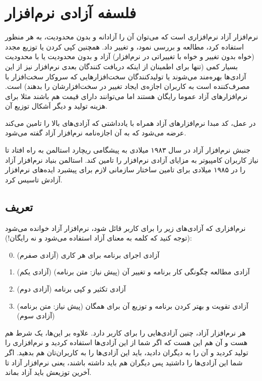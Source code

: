 \section{فلسفه آزادی نرم‌افزار}
نرم‌افزار آزاد نرم‌افزاری است که می‌توان آن را آزادانه و بدون محدودیت، به هر منظور استفاده کرد، مطالعه و بررسی نمود، و تغییر داد. همچنین کپی کردن یا توزیع مجدد (خواه بدون تغییر و خواه با تغییراتی در نرم‌افزار) آزاد و بدون محدودیت یا با محدودیت بسیار کمی (تنها برای اطمینان از اینکه دریافت کنندگان بعدی نرم‌افزار نیز از این آزادی‌ها بهره‌مند می‌شوند یا تولیدکنندگان سخت‌افزارهایی که سروکار سخت‌افزار با مصرف‌کننده‌ است به کاربران اجازه‌ی ایجاد تغییر در سخت‌افزارشان را بدهند) است. نرم‌افزارهای آزاد عموما رایگان هستند اما می‌توانند دارای قیمت هم باشند مثلا برای هزینه تولید 
 و دیگر اَشکال توزیع آن.

در عمل، کد مبدا نرم‌افزارهای آزاد همراه با یادداشتی که آزادی‌های بالا را تامین می‌کند عرضه می‌شود که به آن اجازه‌نامه نرم‌افزار آزاد گفته می‌شود.

جنبش نرم‌افزار آزاد در سال ۱۹۸۳ میلادی به پیشگامی ریچارد استالمن به راه افتاد تا نیاز کاربران کامپیوتر به مزایای آزادی نرم‌افزار را تامین کند. استالمن بنیاد نرم‌افزار آزاد را در ۱۹۸۵ میلادی برای تامین ساختار سازمانی لازم برای پیشبرد ایده‌های نرم‌افزار آزادش تاسیس کرد.
\subsection*{تعریف}
\begin{mybox}
	نرم‌افزاری که آزادی‌های زیر را برای کاربر قائل شود، نرم‌افزار آزاد خوانده می‌شود (توجه کنید که کلمه 
	به معنای آزاد استفاده می‌شود و نه رایگان!):
	
	\begin{enumerate}
		\setcounter{enumi}{-1}
		\item آزادی اجرای برنامه برای هر کاری (آزادی صفرم)
		\item آزادی مطالعه چگونگی کار برنامه و تغییر آن (پیش نیاز: متن برنامه) (آزادی یکم)
		\item آزادی تکثیر و کپی برنامه (آزادی دوم)
		\item آزادی تقویت و بهتر کردن برنامه و توزیع آن برای همگان (پیش نیاز: متن برنامه) (آزادی سوم)
		

	\end{enumerate}
\end{mybox}
هر نرم‌افزار آزاد، چنین آزادی‌هایی را برای کاربر دارد. علاوه بر این‌ها، یک شرط هم هست و آن هم این هست که اگر شما از این آزادی‌ها استفاده کردید و نرم‌افزاری را تولید کردید و آن را به دیگران دادید، باید این آزادی‌ها را به کاربران‌تان هم بدهید. اگر شما این آزادی‌ها را داشتید پس دیگران هم باید داشته باشند، یعنی نرم‌افزار آزاد تا آخرین توزیعش باید آزاد بماند.

